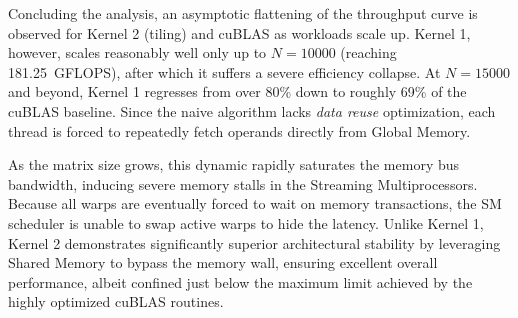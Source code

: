 Concluding the analysis, an asymptotic flattening of the throughput curve is observed for Kernel 2 (tiling) and cuBLAS as workloads scale up. Kernel 1, however, scales reasonably well only up to $N = 10000$ (reaching 181.25~GFLOPS), after which it suffers a severe efficiency collapse. At $N = 15000$ and beyond, Kernel 1 regresses from over 80\% down to roughly 69\% of the cuBLAS baseline. Since the naive algorithm lacks \textit{data reuse} optimization, each thread is forced to repeatedly fetch operands directly from Global Memory. 

As the matrix size grows, this dynamic rapidly saturates the memory bus bandwidth, inducing severe memory stalls in the Streaming Multiprocessors. Because all warps are eventually forced to wait on memory transactions, the SM scheduler is unable to swap active warps to hide the latency. Unlike Kernel 1, Kernel 2 demonstrates significantly superior architectural stability by leveraging Shared Memory to bypass the memory wall, ensuring excellent overall performance, albeit confined just below the maximum limit achieved by the highly optimized cuBLAS routines.


